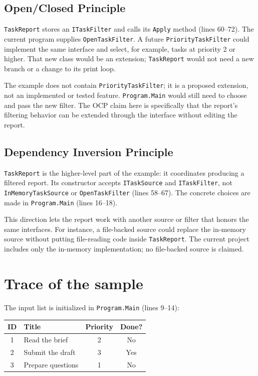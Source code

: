 \documentclass{utmreport}
\begin{document}
\section{Open/Closed Principle}
\texttt{TaskReport} stores an \texttt{ITaskFilter} and calls its \texttt{Apply} method (lines 60--72). The current program supplies \texttt{OpenTaskFilter}. A future \texttt{PriorityTaskFilter} could implement the same interface and select, for example, tasks at priority 2 or higher. That new class would be an extension; \texttt{TaskReport} would not need a new branch or a change to its print loop.

The example does not contain \texttt{PriorityTaskFilter}; it is a proposed extension, not an implemented or tested feature. \texttt{Program.Main} would still need to choose and pass the new filter. The OCP claim here is specifically that the report's filtering behavior can be extended through the interface without editing the report.

\section{Dependency Inversion Principle}
\texttt{TaskReport} is the higher-level part of the example: it coordinates producing a filtered report. Its constructor accepts \texttt{ITaskSource} and \texttt{ITaskFilter}, not \texttt{InMemoryTaskSource} or \texttt{OpenTaskFilter} (lines 58--67). The concrete choices are made in \texttt{Program.Main} (lines 16--18).

This direction lets the report work with another source or filter that honors the same interfaces. For instance, a file-backed source could replace the in-memory source without putting file-reading code inside \texttt{TaskReport}. The current project includes only the in-memory implementation; no file-backed source is claimed.

\chapter{Trace of the sample}
The input list is initialized in \texttt{Program.Main} (lines 9--14):
\begin{center}
\begin{tabular}{c l c c}
\toprule
\textbf{ID} & \textbf{Title} & \textbf{Priority} & \textbf{Done?} \\
\midrule
1 & Read the brief & 2 & No \\
2 & Submit the draft & 3 & Yes \\
3 & Prepare questions & 1 & No \\
\bottomrule
\end{tabular}
\end{center}
\end{document}
